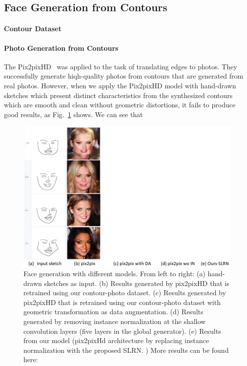
\subsection{Face Generation from Contours}
\label{sec:contourExp}


\paragraph{Contour Dataset} 
%


\paragraph{Photo Generation from Contours}
The Pix2pixHD~\cite{} was applied to the task of translating edges to photos. They successfully generate hiqh-quality photos from contours that are generated from real photos. 
However, when we apply the Pix2pixHD model with hand-drawn sketches which present distinct characteristics from the synthesized contours which are smooth and clean without geometric distortions, it fails to produce good results, as Fig.~\ref{fig:cmp-contour-generation} shows. 
We can see that  
%



\begin{figure}
	\centering
	\includegraphics[width=\columnwidth]{figs/contour-generation.png}
	\caption{Face generation with different models. From left to right: (a) hand-drawn sketches as input. (b) Results generated by pix2pixHD that is retrained using our contour-photo dataset. (c) Results generated by pix2pixHD that is retrained using our contour-photo dataset with geometric transformation as data augmentation. (d) Results generated by removing instance normalization at the shallow convolution layers (five layers in the global generator). (e) Results from our model (pix2pixHd architecture by replacing instance normalization with the proposed SLRN. ) More results can be found here:   }
	\label{fig:cmp-contour-generation}
\end{figure}


